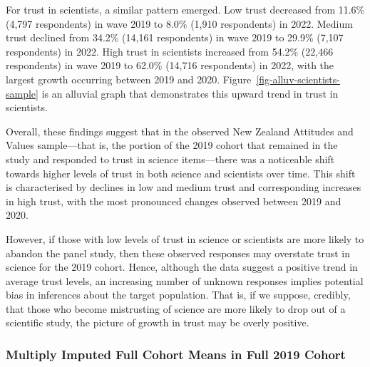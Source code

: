 \documentclass[
  single column]{article}
\begin{document}
For trust in scientists, a similar pattern emerged. Low trust decreased
from 11.6\% (4,797 respondents) in wave 2019 to 8.0\% (1,910
respondents) in 2022. Medium trust declined from 34.2\% (14,161
respondents) in wave 2019 to 29.9\% (7,107 respondents) in 2022. High
trust in scientists increased from 54.2\% (22,466 respondents) in wave
2019 to 62.0\% (14,716 respondents) in 2022, with the largest growth
occurring between 2019 and 2020.
Figure~\ref{fig-alluv-scientists-sample} is an alluvial graph that
demonstrates this upward trend in trust in scientists.

Overall, these findings suggest that in the observed New Zealand
Attitudes and Values sample---that is, the portion of the 2019 cohort
that remained in the study and responded to trust in science
items---there was a noticeable shift towards higher levels of trust in
both science and scientists over time. This shift is characterised by
declines in low and medium trust and corresponding increases in high
trust, with the most pronounced changes observed between 2019 and 2020.

However, if those with low levels of trust in science or scientists are
more likely to abandon the panel study, then these observed responses
may overstate trust in science for the 2019 cohort. Hence, although the
data suggest a positive trend in average trust levels, an increasing
number of unknown responses implies potential bias in inferences about
the target population. That is, if we suppose, credibly, that those who
become mistrusting of science are more likely to drop out of a
scientific study, the picture of growth in trust may be overly positive.

\subsubsection{Multiply Imputed Full Cohort Means in Full 2019
Cohort}\label{multiply-imputed-full-cohort-means-in-full-2019-cohort}
\end{document}
